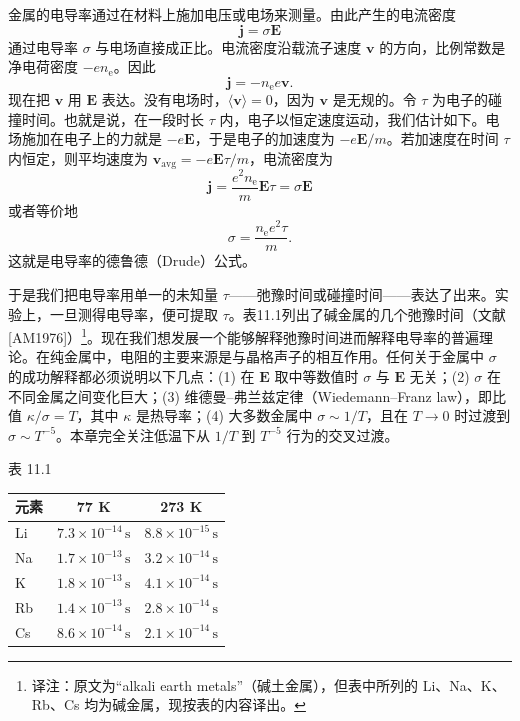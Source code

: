 金属的电导率通过在材料上施加电压或电场来测量。由此产生的电流密度
\begin{equation*}
\mathbf{j}=\sigma\mathbf{E}\tag{11.59}
\end{equation*}
通过电导率 $\sigma$ 与电场直接成正比。电流密度沿载流子速度 $\mathbf{v}$ 的方向，比例常数是净电荷密度 $-en_{\mathrm{e}}$。因此
\begin{equation*}
\mathbf{j}=-n_{\mathrm{e}}e\mathbf{v}.\tag{11.60}
\end{equation*}
现在把 $\mathbf{v}$ 用 $\mathbf{E}$ 表达。没有电场时，$\langle\mathbf{v}\rangle=0$，因为 $\mathbf{v}$ 是无规的。令 $\tau$ 为电子的碰撞时间。也就是说，在一段时长 $\tau$ 内，电子以恒定速度运动，我们估计如下。电场施加在电子上的力就是 $-e\mathbf{E}$，于是电子的加速度为 $-e\mathbf{E}/m$。若加速度在时间 $\tau$ 内恒定，则平均速度为 $\mathbf{v}_{\mathrm{avg}}=-e\mathbf{E}\tau/m$，电流密度为
\begin{equation*}
\mathbf{j}=\frac{e^2n_{\mathrm{e}}}{m}\mathbf{E}\tau=\sigma\mathbf{E}\tag{11.61}
\end{equation*}
或者等价地
\begin{equation*}
\sigma=\frac{n_{\mathrm{e}}e^2\tau}{m}.\tag{11.62}
\end{equation*}
这就是电导率的德鲁德（Drude）公式。

于是我们把电导率用单一的未知量 $\tau$——弛豫时间或碰撞时间——表达了出来。实验上，一旦测得电导率，便可提取 $\tau$。表11.1列出了碱金属的几个弛豫时间（文献 [AM1976]）\footnote{译注：原文为“alkali earth metals”（碱土金属），但表中所列的 Li、Na、K、Rb、Cs 均为碱金属，现按表的内容译出。}。现在我们想发展一个能够解释弛豫时间进而解释电导率的普遍理论。在纯金属中，电阻的主要来源是与晶格声子的相互作用。任何关于金属中 $\sigma$ 的成功解释都必须说明以下几点：(1) 在 $\mathbf{E}$ 取中等数值时 $\sigma$ 与 $\mathbf{E}$ 无关；(2) $\sigma$ 在不同金属之间变化巨大；(3) 维德曼–弗兰兹定律（Wiedemann--Franz law），即比值 $\kappa/\sigma=T$，其中 $\kappa$ 是热导率；(4) 大多数金属中 $\sigma\sim 1/T$，且在 $T\to 0$ 时过渡到 $\sigma\sim T^{-5}$。本章完全关注低温下从 $1/T$ 到 $T^{-5}$ 行为的交叉过渡。

\begin{center}
表 11.1

\begin{tabular}{lcc}
\toprule
元素 & 77 K & 273 K\\
\midrule
Li & $7.3\times 10^{-14}\,\mathrm{s}$ & $8.8\times 10^{-15}\,\mathrm{s}$\\
Na & $1.7\times 10^{-13}\,\mathrm{s}$ & $3.2\times 10^{-14}\,\mathrm{s}$\\
K & $1.8\times 10^{-13}\,\mathrm{s}$ & $4.1\times 10^{-14}\,\mathrm{s}$\\
Rb & $1.4\times 10^{-13}\,\mathrm{s}$ & $2.8\times 10^{-14}\,\mathrm{s}$\\
Cs & $8.6\times 10^{-14}\,\mathrm{s}$ & $2.1\times 10^{-14}\,\mathrm{s}$\\
\bottomrule
\end{tabular}
\end{center}


